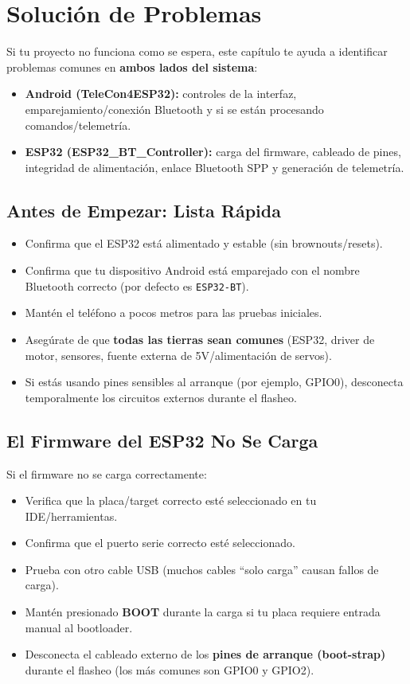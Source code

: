 \chapter{Solución de Problemas}
\label{ch:troubleshooting}

Si tu proyecto no funciona como se espera, este capítulo te ayuda a identificar problemas comunes en
\textbf{ambos lados del sistema}:

\begin{itemize}
    \item \textbf{Android (TeleCon4ESP32):} controles de la interfaz, emparejamiento/conexión Bluetooth y si se están procesando comandos/telemetría.
    \item \textbf{ESP32 (ESP32\_BT\_Controller):} carga del firmware, cableado de pines, integridad de alimentación, enlace Bluetooth SPP y generación de telemetría.
\end{itemize}

\section{Antes de Empezar: Lista Rápida}
\label{sec:quick-checklist}

\begin{itemize}
    \item Confirma que el ESP32 está alimentado y estable (sin brownouts/resets).
    \item Confirma que tu dispositivo Android está emparejado con el nombre Bluetooth correcto (por defecto es \texttt{ESP32-BT}).
    \item Mantén el teléfono a pocos metros para las pruebas iniciales.
    \item Asegúrate de que \textbf{todas las tierras sean comunes} (ESP32, driver de motor, sensores, fuente externa de 5V/alimentación de servos).
    \item Si estás usando pines sensibles al arranque (por ejemplo, GPIO0), desconecta temporalmente los circuitos externos durante el flasheo.
\end{itemize}

\section{El Firmware del ESP32 No Se Carga}
\label{sec:esp32-upload}

Si el firmware no se carga correctamente:

\begin{itemize}
    \item Verifica que la placa/target correcto esté seleccionado en tu IDE/herramientas.
    \item Confirma que el puerto serie correcto esté seleccionado.
    \item Prueba con otro cable USB (muchos cables ``solo carga'' causan fallos de carga).
    \item Mantén presionado \textbf{BOOT} durante la carga si tu placa requiere entrada manual al bootloader.
    \item Desconecta el cableado externo de los \textbf{pines de arranque (boot-strap)} durante el flasheo (los más comunes son GPIO0 y GPIO2).
\end{itemize}

